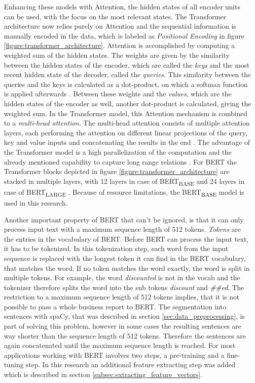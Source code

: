 Enhancing these models with Attention, the hidden states of all encoder units can be used, with the focus on the most relevant states.
The Transformer architecture now relies purely on Attention and the sequential information is manually encoded in the data, which is labeled as \textit{Positional Encoding} in figure \ref{figure:transformer_architecture}.
Attention is accomplished by computing a weighted sum of the hidden states.
The weights are given by the similarity between the hidden states of the encoder, which are called the \textit{keys} and the most recent hidden state of the decoder, called the \textit{queries}.
This similarity between the queries and the keys is calculated as a dot-product, on which a softmax function is applied afterwards \cite[p. 4]{Vaswani2017}.
Between these weights and the \textit{values}, which are the hidden states of the encoder as well, another dot-product is calculated, giving the weighted sum.
In the Transformer model, this Attention mechanism is combined to a \textit{multi-head attention}.
The multi-head attention consists of multiple attention layers, each performing the attention on different linear projections of the query, key and value inputs and concatenating the results in the end \cite[pp. 4-5]{Vaswani2017}.
The advantage of the Transformer model is a high parallelization of the computation and the already mentioned capability to capture long range relations \cite[p. 2]{Vaswani2017}.
For \ac{BERT} the Transformer blocks depicted in figure \ref{figure:transformer_architecture} are stacked in multiple layers, with 12 layers in case of BERT\textsubscript{BASE} and 24 layers in case of BERT\textsubscript{LARGE} \cite[p. 3]{Devlin2018}.
Because of resource limitations, the BERT\textsubscript{BASE} model is used in this research.

Another important property of \ac{BERT} that can't be ignored, is that it can only process input text with a maximum sequence length of 512 tokens.
\textit{Tokens} are the entries in the vocabulary of \ac{BERT}.
Before \ac{BERT} can process the input text, it has to be tokenized.
In this tokenization step, each word from the input sequence is replaced with the longest token it can find in the \ac{BERT} vocabulary, that matches the word.
If no token matches the word exactly, the word is split in multiple tokens.
For example, the word \textit{discounted} is not in the vocab and the tokenizer therefore splits the word into the sub tokens \textit{discount} and \textit{\#\#ed}.
The restriction to a maximum sequence length of 512 tokens implies, that it is not possible to pass a whole business report to \ac{BERT}.
The segmentation into sentences with spaCy, that was described in section \ref{sec:data_preprocessing}, is part of solving this problem, however in some cases the resulting sentences are way shorter than the sequence length of 512 tokens.
Therefore the sentences are again concatenated until the maximum sequence length is reached.
For most applications working with \ac{BERT} involves two steps, a pre-training and a fine-tuning step.
In this research an additional feature extracting step was added which is described in section \ref{subsec:extracting_feature_vectors}.

